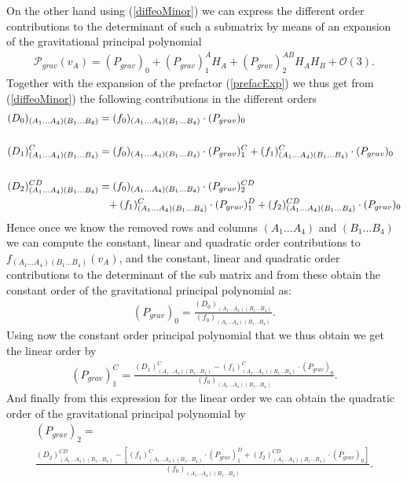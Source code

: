 \documentclass[a4paper,12pt, DIV=14, BCOR=5mm, twoside, headsepline]{scrbook}
\begin{document}
On the other hand using (\ref{diffeoMinor}) we can express the different order contributions to the determinant of such a submatrix by means of an expansion of the gravitational principal polynomial
\begin{align}
    \mathcal{P}_{grav}(v_A) = (P_{grav})_{0} + (P_{grav})^A_1 H_A+ (P_{grav})^{AB}_2 H_A H_B +\mathcal{O}(3).
\end{align}
Together with the expansion of the prefactor (\ref{prefacExp}) we thus get from (\ref{diffeoMinor}) the following contributions in the different orders
\begin{align}\label{minorPoly}
    \begin{aligned}
    (D_0)_{(A_1...A_4)(B_1...B_4)}  &= (f_0)_{(A_1...A_4)(B_1...B_4)} \cdot (P_{grav})_0 \\
    \\
    (D_1)^C_{(A_1...A_4)(B_1...B_4)}  &= (f_0)_{(A_1...A_4)(B_1...B_4)} \cdot (P_{grav})^C_1 + (f_1)^C_{(A_1...A_4)(B_1...B_4)} \cdot (P_{grav})_0  \\
    \\
    (D_2)^{CD}_{(A_1...A_4)(B_1...B_4)}  &=  (f_0)_{(A_1...A_4)(B_1...B_4)} \cdot (P_{grav})_2^{CD} \\
     & \hphantom{=} +
     (f_1)^C_{(A_1...A_4)(B_1...B_4)} \cdot (P_{grav})_1^D +(f_2)^{CD}_{(A_1...A_4)(B_1...B_4)} \cdot (P_{grav})_0 
    \end{aligned}
\end{align}
Hence once we know the removed rows and columns $(A_1...A_4)$ and $(B_1...B_4)$ we can compute the constant, linear and quadratic order contributions to $f_{(A_1...A_4)(B_1...B_4)}(v_A)$, and the constant, linear and quadratic order contributions to the determinant of the sub matrix and from these obtain the constant order of the gravitational principal polynomial as:
\begin{align}\label{POLY1}
(P_{grav})_0 = \frac{(D_0)_{(A_1...A_4)(B_1...B_4)}}{(f_0)_{(A_1...A_4)(B_1...B_4)}}.
\end{align}
Using now the constant order principal polynomial that we thus obtain we get the linear order by
\begin{align}\label{POLY2}
    (P_{grav})^C_1= \frac{(D_1)^C_{(A_1...A_4)(B_1...B_4)} - (f_1)^C_{(A_1...A_4)(B_1...B_4)} \cdot (P_{grav})_0}{(f_0)_{(A_1...A_4)(B_1...B_4)}}.
\end{align}
And finally from this expression for the linear order we can obtain the quadratic order of the gravitational principal polynomial by 
\begin{multline}\label{POLY3}
    (P_{grav})_2 = \\
    \frac{(D_2)^{CD}_{(A_1...A_4)(B_1...B_4)}-\left [ (f_1)^C_{(A_1...A_4)(B_1...B_4)} \cdot (P_{grav})^D_1  +(f_2)^{CD}_{(A_1...A_4)(B_1...B_4)} \cdot (P_{grav})_0 \right ]}{(f_0)_{(A_1...A_4)(B_1...B_4)}}.
\end{multline}
\end{document}
